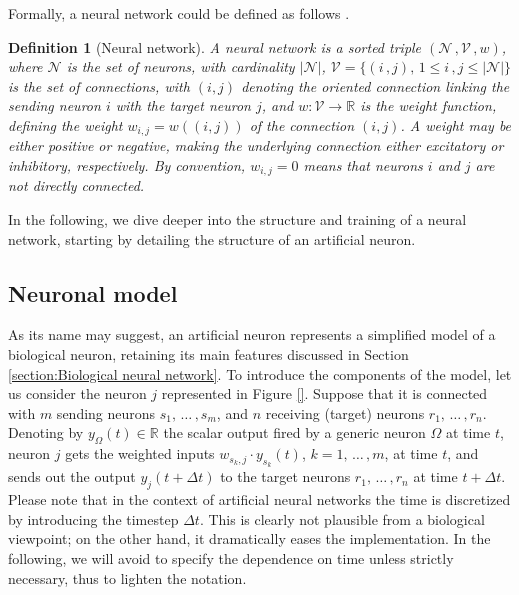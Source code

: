 \documentclass[11pt, a4paper]{report}
\numberwithin{equation}{chapter}
\theoremstyle{theorem}
\theoremstyle{definition}
\newtheorem{definition}{Definition}[chapter]
\numberwithin{figure}{section}
\begin{document}
		Formally, a neural network could be defined as follows \cite{Kri}.
		
		\begin{definition}[Neural network]
			\label{def:neural-network}
			\emph{
			A \emph{neural network} is a sorted triple $\left( \mathcal{N} \, , \mathcal{V} \, , w \right)$, where $\mathcal{N}$ is the set of \emph{neurons}, with cardinality $|\mathcal{N}|$, $\mathcal{V} = \lbrace (i \, , j), \, 1 \leq i \, , j  \leq |\mathcal{N}| \rbrace$ is the set of \emph{connections}, with $(i,j)$ denoting the oriented connection linking the sending neuron $i$ with the target neuron $j$, and $w : \mathcal{V} \rightarrow \mathbb{R}$ is the \emph{weight function}, defining the weight $w_{i,j} = w((i,j))$ of the connection $(i,j)$. A weight may be either positive or negative, making the underlying connection either excitatory or inhibitory, respectively. By convention, $w_{i,j} = 0$ means that neurons $i$ and $j$ are not directly connected.
			}
		\end{definition}
		
		In the following, we dive deeper into the structure and training of a neural network, starting by detailing the structure of an artificial neuron.  
														
	\subsection{Neuronal model}
	\label{section:Neuronal model}
	
		As its name may suggest, an artificial neuron represents a simplified model of a biological neuron, retaining its main features discussed in Section \ref{section:Biological neural network}. To introduce the components of the model, let us consider the neuron $j$ represented in Figure \ref{}. Suppose that it is connected with $m$ sending neurons $s_1, \, \ldots \, , s_m$, and $n$ receiving (target) neurons $r_1, \, \ldots \, , r_n$. Denoting by $y_{\Omega}(t) \in \mathbb{R}$ the scalar output fired by a generic neuron $\Omega$ at time $t$, neuron $j$ gets the weighted inputs $w_{s_k,j} \cdot y_{s_k}(t)$, $k = 1, \, \ldots \, , m$, at time $t$, and sends out the output $y_j(t + \Delta t)$ to the target neurons $r_1, \, \ldots \, , r_n$ at time $t + \Delta t$. Please note that in the context of artificial neural networks the time is discretized by introducing the timestep $\Delta t$. This is clearly not plausible from a biological viewpoint; on the other hand, it dramatically eases the implementation. In the following, we will avoid to specify the dependence on time unless strictly necessary, thus to lighten the notation.
		
\end{document}
